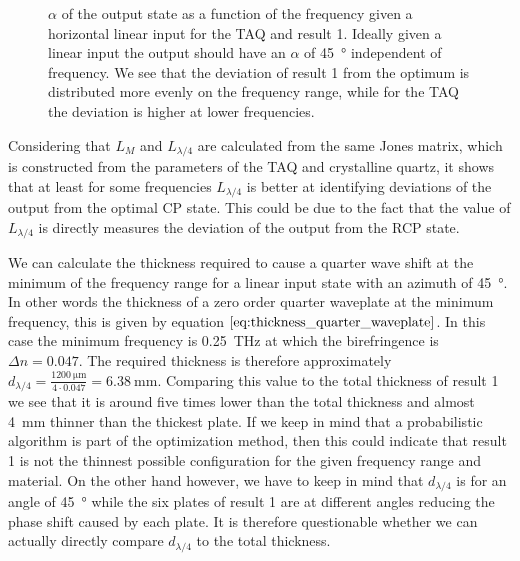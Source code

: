 \begin{figure}[H]
    \centering
    
    \caption{$\alpha$ of the output state as a function of the frequency given a horizontal linear input for the TAQ and result 1. Ideally given a linear input the output should have an $\alpha$ of \SI{45}{\degree} independent of frequency. We see that the deviation of result 1 from the optimum is distributed more evenly on the frequency range, while for the TAQ the deviation is higher at lower frequencies.}
    \label{fig:cl4_alpha}
\end{figure}

Considering that $L_M$ and $L_{\lambda/4}$ are calculated from the same Jones matrix, which is constructed from the parameters of the TAQ and crystalline quartz, it shows that at least for some frequencies $L_{\lambda/4}$ is better at identifying deviations of the output from the optimal CP state. This could be due to the fact that the value of $L_{\lambda/4}$ is directly measures the deviation of the output from the RCP state.

We can calculate the thickness required to cause a quarter wave shift at the minimum of the frequency range for a linear input state with an azimuth of \SI{45}{\degree}. In other words the thickness of a zero order quarter waveplate at the minimum frequency, this is given by equation $\ref{eq:thickness_quarter_waveplate}$. In this case the minimum frequency is \SI{0.25}{\tera \hertz} at which the birefringence is $\Delta n = 0.047$. The required thickness is therefore approximately $d_{\lambda/4}=\frac{\SI{1200}{\micro \meter}}{4\cdot0.047}=\SI{6.38}{\milli \meter}$. Comparing this value to the total thickness of result 1 we see that it is around five times lower than the total thickness and almost \SI{4}{\milli \meter} thinner than the thickest plate. If we keep in mind that a probabilistic algorithm is part of the optimization method, then this could indicate that result 1 is not the thinnest possible configuration for the given frequency range and material. On the other hand however, we have to keep in mind that $d_{\lambda/4}$ is for an angle of \SI{45}{\degree} while the six plates of result 1 are at different angles reducing the phase shift caused by each plate. It is therefore questionable whether we can actually directly compare $d_{\lambda/4}$ to the total thickness. 

